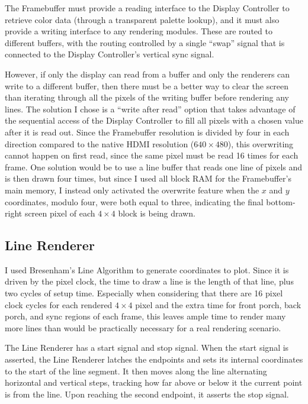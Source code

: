 \documentclass[11pt,conference]{IEEEtran}
\begin{document}
The Framebuffer must provide a reading interface to the Display Controller to retrieve 
color data (through a transparent palette lookup), and it must also provide a writing interface to any rendering modules.
These are routed to different buffers, with the routing controlled by a single ``swap'' signal that is connected to the Display Controller's vertical sync signal.

However, if only the display can read from a buffer and only the renderers can write to a different buffer, then there must be a better way to clear the screen than iterating through all the pixels of the writing buffer before rendering any lines.
The solution I chose is a ``write after read'' option that takes advantage of the sequential access of the Display Controller to fill all pixels with a chosen value after it is read out.
Since the Framebuffer resolution is divided by four in each direction compared to the native HDMI resolution ($640\times480$), this overwriting cannot happen on first read, since the same pixel must be read 16 times for each frame.
One solution would be to use a line buffer that reads one line of pixels and is then drawn four times, but since I used all block RAM for the Framebuffer's main memory, I instead only activated the overwrite feature when the $x$ and $y$ coordinates, modulo four, were both equal to three, indicating the final bottom-right screen pixel of each $4\times4$ block is being drawn.

\subsection{Line Renderer}
I used Bresenham's Line Algorithm\cite{Bresenham} to generate coordinates to plot.
Since it is driven by the pixel clock, the time to draw a line is the length of that line, plus two cycles of setup time.
Especially when considering that there are 16 pixel clock cycles for each rendered $4\times4$ pixel and the extra time for front porch, back porch, and sync regions of each frame, this leaves ample time to render many more lines than would be practically necessary for a real rendering scenario.

The Line Renderer has a start signal and stop signal.
When the start signal is asserted, the Line Renderer latches the endpoints and sets its internal coordinates to the start of the line segment.
It then moves along the line alternating horizontal and vertical steps, tracking how far above or below it the current point is from the line.
Upon reaching the second endpoint, it asserts the stop signal.
\end{document}
